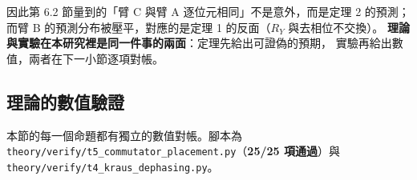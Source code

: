 \documentclass[11pt,a4paper]{ctexart}
\begin{document}
\begin{table}[t]
\centering
\caption{四條消融臂與對應的定理。臂 B 與臂 C
的唯一差別，就是「後面有沒有 \(R_{Y}\)」。}
\end{table}


因此第 6.2 節量到的「臂 C 與臂 A 逐位元相同」不是意外，而是定理 2
的預測； 而臂 B 的預測分布被壓平，對應的是定理 1 的反面（\(R_{Y}\)
與去相位不交換）。
\textbf{理論與實驗在本研究裡是同一件事的兩面}：定理先給出可證偽的預期，
實驗再給出數值，兩者在下一小節逐項對帳。

\subsection{理論的數值驗證}

本節的每一個命題都有獨立的數值對帳。腳本為
\texttt{theory/\allowbreak verify/\allowbreak t5\_\allowbreak commutator\_\allowbreak placement.py}（\textbf{25/25
項通過}）與 \texttt{theory/\allowbreak verify/\allowbreak t4\_\allowbreak kraus\_\allowbreak dephasing.py}。
\end{document}
